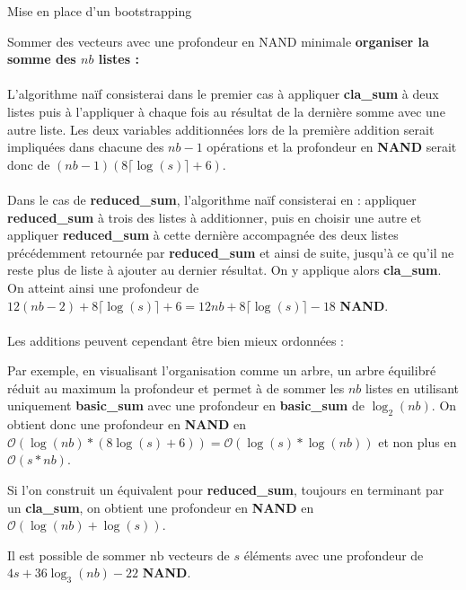 \begin{section}{Mise en place d'un bootstrapping}
\begin{subsection}{Sommer des vecteurs avec une profondeur en NAND minimale}
\vspace{0.3cm}
\noindent
\textbf{organiser la somme des $nb$ listes :}
\paragraph{}
	L'algorithme naïf consisterai dans le premier cas à appliquer
	\textbf{cla\_sum} à deux listes puis à l'appliquer à chaque fois au
	résultat de la dernière somme avec une autre liste. Les deux variables
	additionnées lors de la première addition serait impliquées dans
	chacune	des $nb-1$ opérations et la profondeur en \textbf{NAND} serait
	donc de $(nb-1)(8\lceil\log(s)\rceil + 6)$.
	
\paragraph{}
	Dans le cas de \textbf{reduced\_sum}, l'algorithme naïf consisterai en
	: appliquer \textbf{reduced\_sum} à trois des listes à additionner,
	puis en choisir une autre et appliquer \textbf{reduced\_sum} à cette
	dernière accompagnée des deux listes précédemment retournée par
	\textbf{reduced\_sum} et ainsi de suite, jusqu'à ce qu'il ne reste plus
	de liste à ajouter au dernier résultat. On y applique alors \textbf{cla\_sum}. On atteint ainsi une profondeur de 
	$12(nb - 2) + 8 \lceil \log(s) \rceil + 6 = 12 nb + 8 \lceil \log(s)
	\rceil - 18$ \textbf{NAND}.
	
\paragraph{}
	Les additions peuvent cependant être bien mieux ordonnées :
	
	Par exemple, en visualisant l'organisation comme un arbre, un arbre
	équilibré réduit au maximum la profondeur et permet à de sommer les
	$nb$ listes en utilisant uniquement \textbf{basic\_sum} avec une
	profondeur en \textbf{basic\_sum} de $\log_2(nb)$. On obtient donc une
	profondeur en \textbf{NAND} en $\mathcal{O}(\log(nb) * (8\log(s) + 6))
	= \mathcal{O}(\log(s) * \log(nb))$ et non plus en $\mathcal{O}(s * nb)$.

	Si l'on construit un équivalent pour \textbf{reduced\_sum}, toujours en
	terminant par un \textbf{cla\_sum}, on obtient une profondeur en
	\textbf{NAND} en $\mathcal{O}(\log(nb) + \log(s))$.

\begin{prop}
	Il est possible de sommer $\text{nb}$ vecteurs de $s$ éléments avec une profondeur de $4s + 36\log_3(nb) -22$ \textbf{NAND}.
\end{prop}


\end{subsection}
\end{section}
